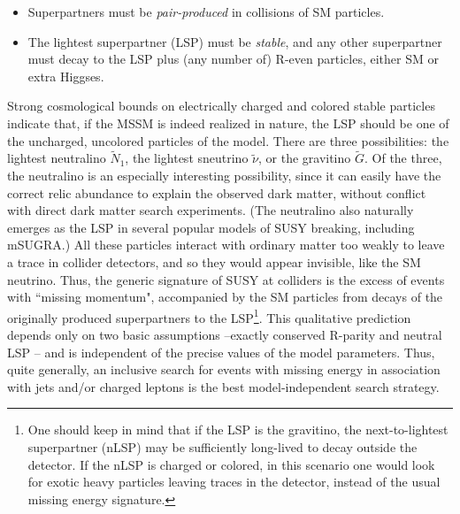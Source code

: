 \documentclass{ws-procs9x6}
\begin{document}
\begin{itemize}

\item Superpartners must be {\it pair-produced} in collisions of SM particles.

\item The lightest superpartner (LSP) must be {\it stable}, and any other superpartner must decay to the LSP plus (any number of) R-even particles, either SM or extra Higgses. 

\end{itemize}

Strong cosmological bounds on electrically charged and colored stable particles indicate that, if the MSSM is indeed realized in nature, the LSP should be one of the uncharged, uncolored particles of the model. There are three possibilities: the lightest neutralino $\tilde{N}_1$, the lightest sneutrino $\tilde{\nu}$, or the gravitino $\tilde{G}$. Of the three, the neutralino is an especially interesting possibility, since it can easily have the correct relic abundance to explain the observed dark matter, without conflict with direct dark matter search experiments. (The neutralino also naturally emerges as the LSP in several popular models of SUSY breaking, including mSUGRA.)
All these particles interact with ordinary matter too weakly to leave a trace in collider detectors, and so they would appear invisible, like the SM neutrino. Thus, the generic signature of SUSY at colliders is the excess of events with ``missing momentum", accompanied by the SM particles from decays of the originally produced superpartners to the LSP\footnote{One should keep in mind that if the LSP is the gravitino, the next-to-lightest superpartner (nLSP) may be sufficiently long-lived to decay outside the detector. If the nLSP is charged or colored, in this scenario one would look for exotic heavy particles leaving traces in the detector, instead of the usual missing energy signature.}. This qualitative prediction depends only on two basic assumptions --exactly conserved R-parity and neutral LSP -- and is independent of the precise values of the model parameters. Thus, quite generally, an inclusive search for events with missing energy in association with jets and/or charged leptons is the best model-independent search strategy.
\end{document}
